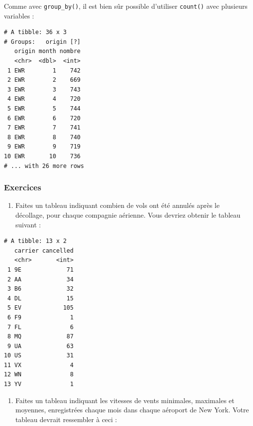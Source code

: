 \documentclass[a4paperpaper,]{article}
\newenvironment{Shaded}{\begin{snugshade}}{\end{snugshade}}
\newcommand{\DataTypeTok}[1]{\textcolor[rgb]{0.00,0.34,0.68}{#1}}
\newcommand{\KeywordTok}[1]{\textcolor[rgb]{0.12,0.11,0.11}{\textbf{#1}}}
\newcommand{\NormalTok}[1]{\textcolor[rgb]{0.12,0.11,0.11}{#1}}
\newcommand{\OperatorTok}[1]{\textcolor[rgb]{0.12,0.11,0.11}{#1}}
\newcommand{\StringTok}[1]{\textcolor[rgb]{0.75,0.01,0.01}{#1}}
\providecommand{\tightlist}{%
  \setlength{\itemsep}{0pt}\setlength{\parskip}{0pt}}
\theoremstyle{definition}
\theoremstyle{definition}
\theoremstyle{definition}
\theoremstyle{remark}
\begin{document}
Comme avec \texttt{group\_by()}, il est bien sûr possible d'utiliser
\texttt{count()} avec plusieurs variables :

\begin{Shaded}
\end{Shaded}

\begin{verbatim}
# A tibble: 36 x 3
# Groups:   origin [?]
   origin month nombre
   <chr>  <dbl>  <int>
 1 EWR        1    742
 2 EWR        2    669
 3 EWR        3    743
 4 EWR        4    720
 5 EWR        5    744
 6 EWR        6    720
 7 EWR        7    741
 8 EWR        8    740
 9 EWR        9    719
10 EWR       10    736
# ... with 26 more rows
\end{verbatim}

\hypertarget{exercices-9}{%
\subsubsection{Exercices}\label{exercices-9}}

\begin{enumerate}
\def\labelenumi{\arabic{enumi}.}
\tightlist
\item
  Faites un tableau indiquant combien de vols ont été annulés après le
  décollage, pour chaque compagnie aérienne. Vous devriez obtenir le
  tableau suivant :
\end{enumerate}

\begin{verbatim}
# A tibble: 13 x 2
   carrier cancelled
   <chr>       <int>
 1 9E             71
 2 AA             34
 3 B6             32
 4 DL             15
 5 EV            105
 6 F9              1
 7 FL              6
 8 MQ             87
 9 UA             63
10 US             31
11 VX              4
12 WN              8
13 YV              1
\end{verbatim}

\begin{enumerate}
\def\labelenumi{\arabic{enumi}.}
\setcounter{enumi}{1}
\tightlist
\item
  Faites un tableau indiquant les vitesses de vents minimales, maximales
  et moyennes, enregistrées chaque mois dans chaque aéroport de New
  York. Votre tableau devrait ressembler à ceci :
\end{enumerate}
\end{document}
